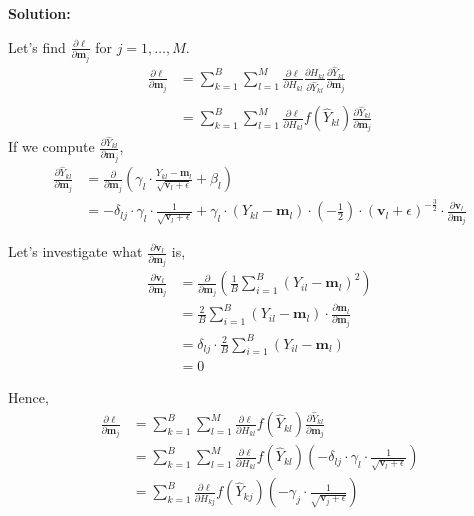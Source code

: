 \documentclass{article}
\newenvironment{solution}
  {\par\noindent\textbf{Solution:}\par}
  {\par}
\begin{document}
\begin{solution}
  Let's find $\frac{\partial \ell}{\partial \textbf{m}_j}$ for $j = 1,\dots,M$.
\[ 
  \begin{aligned}
    \frac{\partial \ell}{\partial \textbf{m}_j} &= \sum_{k = 1}^{B} \sum_{l = 1}^{M} \frac{\partial \ell}{\partial H_{kl}}\frac{\partial H_{kl}}{\partial \hat{Y}_{kl}}\frac{\partial \hat{Y}_{kl}}{\partial \textbf{m}_j}  \\
                                             \\ &=\sum_{k = 1}^{B} \sum_{l = 1}^{M} \frac{\partial \ell}{\partial H_{kl}}f(\hat{Y}_{kl})\frac{\partial \hat{Y}_{kl}}{\partial \textbf{m}_j}
  \end{aligned}
  \]
  If we compute $\frac{\partial \hat{Y}_{kl}}{\partial \textbf{m}_j}$, 
\[
    \begin{aligned}
      \frac{\partial \hat{Y}_{kl}}{\partial \textbf{m}_j} &= \frac{\partial}{\partial \textbf{m}_j}  \left( \gamma_l \cdot \frac{ Y_{kl} - \textbf{m}_l }{\sqrt{\textbf{v}_l + \epsilon}} + \beta_l \right) \\  
                                                          &= - \delta_{lj}\cdot \gamma_l \cdot \frac{1}{\sqrt{\textbf{v}_l + \epsilon}} + \gamma_l \cdot (Y_{kl} - \textbf{m}_l) \cdot (-\frac{1}{2}) \cdot (\textbf{v}_l + \epsilon)^{-\frac{3}{2}} \cdot \frac{\partial \textbf{v}_l}{\partial \textbf{m}_j}  
    \end{aligned}
  \]

  Let's investigate what $\frac{\partial \textbf{v}_l}{\partial \textbf{m}_j}$ is,
  \[
  \begin{aligned}
    \frac{\partial \textbf{v}_l}{\partial \textbf{m}_j} &= \frac{\partial}{\partial \textbf{m}_j} \left( \frac{1}{B}\sum_{i=1}^B (Y_{il} - \textbf{m}_l)^2 \right)  \\ 
                                                        &=\frac{2}{B} \sum_{i=1}^B (Y_{il} - \textbf{m}_l) \cdot \frac{\partial \textbf{m}_l}{\partial \textbf{m}_j} \\ 
                                                        &= \delta_{lj}\cdot \frac{2}{B} \sum_{i=1}^B (Y_{il} - \textbf{m}_l) \\ 
                                                        &= 0
  \end{aligned}
  \]

  Hence,
    \[
      \begin{aligned}
        \frac{\partial \ell}{\partial \textbf{m}_j} &=\sum_{k = 1}^{B} \sum_{l = 1}^{M} \frac{\partial \ell}{\partial H_{kl}}f(\hat{Y}_{kl})\frac{\partial \hat{Y}_{kl}}{\partial \textbf{m}_j} \\ 
                                                    &= \sum_{k = 1}^{B} \sum_{l = 1}^{M} \frac{\partial \ell}{\partial H_{kl}}f(\hat{Y}_{kl})\left(  - \delta_{lj}\cdot \gamma_l \cdot \frac{1}{\sqrt{\textbf{v}_l + \epsilon}} \right)  \\ 
                                                    &=\sum_{k=1}^B \frac{\partial \ell}{\partial H_{kj}} f(\hat{Y}_{kj}) \left( -\gamma_j \cdot \frac{1}{\sqrt{\textbf{v}_j + \epsilon}} \right)
      \end{aligned}
  \]


\end{solution}
\end{document}

